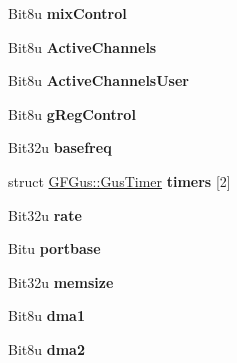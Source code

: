 \begin{DoxyCompactItemize}
\item 
\hypertarget{structGFGus_a426b7aa4b22584a270efc3b9f7dd6fab}{Bit8u {\bfseries mix\-Control}}\label{structGFGus_a426b7aa4b22584a270efc3b9f7dd6fab}

\item 
\hypertarget{structGFGus_ae8d8e079f6f84bb7a8873468eaea97d7}{Bit8u {\bfseries Active\-Channels}}\label{structGFGus_ae8d8e079f6f84bb7a8873468eaea97d7}

\item 
\hypertarget{structGFGus_a37b1ebcbe19c5eb7703d689933158850}{Bit8u {\bfseries Active\-Channels\-User}}\label{structGFGus_a37b1ebcbe19c5eb7703d689933158850}

\item 
\hypertarget{structGFGus_ad696f706f977946e998a072f2618f897}{Bit8u {\bfseries g\-Reg\-Control}}\label{structGFGus_ad696f706f977946e998a072f2618f897}

\item 
\hypertarget{structGFGus_af0844468a58782bb624bd5348aad9fe1}{Bit32u {\bfseries basefreq}}\label{structGFGus_af0844468a58782bb624bd5348aad9fe1}

\item 
\hypertarget{structGFGus_a4126dd0c0afae7f1b4c2c4809028962c}{struct \hyperlink{structGFGus_1_1GusTimer}{G\-F\-Gus\-::\-Gus\-Timer} {\bfseries timers} \mbox{[}2\mbox{]}}\label{structGFGus_a4126dd0c0afae7f1b4c2c4809028962c}

\item 
\hypertarget{structGFGus_ab7c58ef593b76322e9b4ff7a4032886d}{Bit32u {\bfseries rate}}\label{structGFGus_ab7c58ef593b76322e9b4ff7a4032886d}

\item 
\hypertarget{structGFGus_af1524523012bf8b71742d3e5b8a9f45e}{Bitu {\bfseries portbase}}\label{structGFGus_af1524523012bf8b71742d3e5b8a9f45e}

\item 
\hypertarget{structGFGus_aefc3bdb890dc452e3cc8a338822f3953}{Bit32u {\bfseries memsize}}\label{structGFGus_aefc3bdb890dc452e3cc8a338822f3953}

\item 
\hypertarget{structGFGus_a8f85bbf75654bc07c18c99ace603abfa}{Bit8u {\bfseries dma1}}\label{structGFGus_a8f85bbf75654bc07c18c99ace603abfa}

\item 
\hypertarget{structGFGus_a2c5b80f3d718d473666275ca05426004}{Bit8u {\bfseries dma2}}\label{structGFGus_a2c5b80f3d718d473666275ca05426004}


\end{DoxyCompactItemize}
